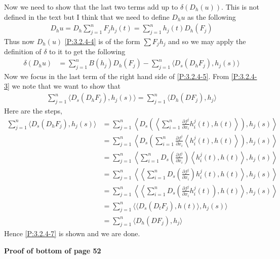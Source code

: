 \documentclass[a4paper,11pt]{article}
\numberwithin{equation}{section}
\theoremstyle{plain}
\theoremstyle{definition}
\numberwithin{NQ}{section}
\numberwithin{LQ}{section}
\numberwithin{ZQ}{section}
\begin{document}
Now we need to show that the last two terms add up to $\delta(D_h(u))$. This is not defined in the text but I think that we need to define $D_hu$ as the following
\begin{align}
D_hu = D_h \sum_{j=1}^n F_jh_j(t) =  \sum_{j=1}^n h_j(t) D_h(F_j) \label{P:3.2.4-4}
\end{align}
Thus now $D_h(u)$ \eqref{P:3.2.4-4} is of the form $\sum F_j h_j$ and so we may apply the definition of $\delta$ to it to get the following
\begin{align}
\delta(D_hu) & = \sum_{j=1}^n B(h_j) D_h(F_j) -  \sum_{j=1}^n \langle D_s(D_hF_j), h_j(s) \rangle \label{P:3.2.4-5}
\end{align}
Now we focus in the last term of the right hand side of \eqref{P:3.2.4-5}. From \eqref{P:3.2.4-3} we note that we want to show that
\begin{align}
\sum_{j=1}^n \langle D_s(D_hF_j), h_j(s) \rangle = \sum_{j=1}^n \bigg\langle D_h\left(DF_j\right), h_j \bigg\rangle \label{P:3.2.4-7}
\end{align}
Here are the steps,
\begin{align*}
	\sum_{j=1}^n \langle D_s(D_hF_j), h_j(s) \rangle &= \sum_{j=1}^n \left\langle D_s\left( \left\langle \sum_{i=1}^n \frac{\partial f^j}{\partial x_i} h_i^j(t),h(t) \right\rangle \right), h_j(s) \right\rangle
	\\&  = \sum_{j=1}^n \left\langle D_s\left( \sum_{i=1}^n \frac{\partial f^j}{\partial x_i} \left\langle  h_i^j(t),h(t) \right\rangle \right), h_j(s) \right\rangle
	\\& = \sum_{j=1}^n \left\langle \sum_{i=1}^n D_s\left(  \frac{\partial f^j}{\partial x_i}\right) \left\langle  h_i^j(t),h(t) \right\rangle , h_j(s) \right\rangle
	\\& = \sum_{j=1}^n \left\langle \left\langle \sum_{i=1}^n D_s\left(  \frac{\partial f^j}{\partial x_i}\right)   h_i^j(t),h(t) \right\rangle , h_j(s) \right\rangle
	\\& = \sum_{j=1}^n \left\langle \left\langle \sum_{i=1}^n D_s\left(  \frac{\partial f^j}{\partial x_i}h_i^j(t)\right)  ,h(t) \right\rangle , h_j(s) \right\rangle
	\\& = \sum_{j=1}^n \bigg\langle \big\langle  D_s\left(  D_tF_j\right)  ,h(t) \big\rangle , h_j(s) \bigg\rangle
	\\& = \sum_{j=1}^n \bigg\langle  D_h\left(  DF_j\right) , h_j \bigg\rangle
\end{align*}
Hence \eqref{P:3.2.4-7} is shown and we are done.

\textbf{Proof of bottom of page 52}
\end{document}
